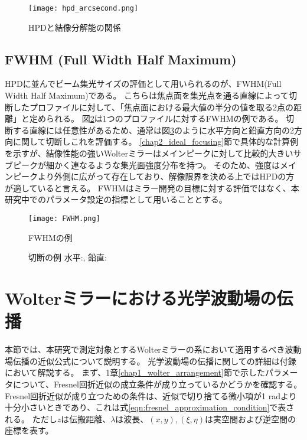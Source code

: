 \begin{figure}[ht]
\centering
\texttt{[image: hpd\_arcsecond.png]}
\caption{HPDと結像分解能の関係}
\label{fig:hpd_arcsecond}
\end{figure}


\subsection{FWHM (Full Width Half Maximum)}
\label{chap2_fwhm}

HPDに並んでビーム集光サイズの評価として用いられるのが、FWHM(Full Width Half Maximum)である。
こちらは焦点面を集光点を通る直線によって切断したプロファイルに対して、「焦点面における最大値の半分の値を取る2点の距離」と定められる。
図\ref{fig:fwhm_explanation_profile}は1つのプロファイルに対するFWHMの例である。
切断する直線には任意性があるため、通常は図\ref{fig:fwhm_explanation}のように水平方向と鉛直方向の2方向に関して切断しこれを評価する。
\ref{chap2_ideal_focusing}節で具体的な計算例を示すが、結像性能の強いWolterミラーはメインピークに対して比較的大きいサブピークが細かく連なるような集光面強度分布を持つ。
そのため、強度はメインピークより外側に広がって存在しており、解像限界を決める上ではHPDの方が適していると言える。
FWHMはミラー開発の目標に対する評価ではなく、本研究中でのパラメータ設定の指標として用いることとする。

\begin{figure}[ht]
\centering
\texttt{[image: FWHM.png]}
\caption{FWHMの例}
\label{fig:fwhm_explanation_profile}
\end{figure}

\begin{figure}[!ht]
\centering

\caption[]{切断の例 水平:, 鉛直:}
\label{fig:fwhm_explanation}
\end{figure}


\clearpage
\newpage

\section{Wolterミラーにおける光学波動場の伝播}
\label{chap2_wolter_diffraction_apporoximation}
本節では、本研究で測定対象とするWolterミラーの系において適用するべき波動場伝播の近似公式について説明する。
光学波動場の伝播に関しての詳細は付録において解説する。
まず、1章\ref{chap1_wolter_arrangement}節で示したパラメータについて、Fresnel回折近似の成立条件が成り立っているかどうかを確認する。
Fresnel回折近似が成り立つための条件は、近似で切り捨てる微小項が1 radより十分小さいときであり、これは式\ref{eqn:fresnel_approximation_condition}で表される。
ただし$z$は伝搬距離、$\lambda$は波長、$(x, y), (\xi, \eta)$は実空間および逆空間の座標を表す。

